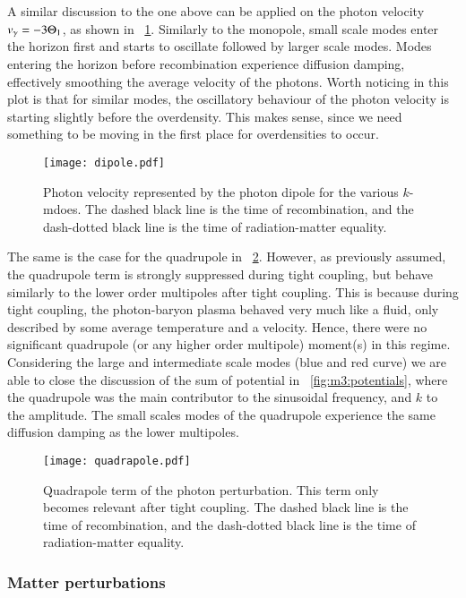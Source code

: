     A similar discussion to the one above can be applied on the photon velocity $v_\gamma = -3\Theta_1$, as shown in ~\cref{fig:m3:dipole}. Similarly to the monopole, small scale modes enter the horizon first and starts to oscillate followed by larger scale modes. Modes entering the horizon before recombination experience diffusion damping, effectively smoothing the average velocity of the photons. Worth noticing in this plot is that for similar modes, the oscillatory behaviour of the photon velocity is starting slightly before the overdensity. This makes sense, since we need something to be moving in the first place for overdensities to occur. 

    \begin{figure}
        \texttt{[image: dipole.pdf]}
        \caption{Photon velocity represented by the photon dipole for the various $k$-mdoes. The dashed black line is the time of recombination, and the dash-dotted black line is the time of radiation-matter equality.}
        \label{fig:m3:dipole}
    \end{figure}

    The same is the case for the quadrupole in ~\cref{fig:m3:quadrapole}. However, as previously assumed, the quadrupole term is strongly suppressed during tight coupling, but behave similarly to the lower order multipoles after tight coupling. This is because during tight coupling, the photon-baryon plasma behaved very much like a fluid, only described by some average temperature and a velocity. Hence, there were no significant quadrupole (or any higher order multipole) moment(s) in this regime. Considering the large and intermediate scale modes (blue and red curve) we are able to close the discussion of the sum of potential in ~\cref{fig:m3:potentials}, where the quadrupole was the main contributor to the sinusoidal frequency, and $k$ to the amplitude. The small scales modes of the quadrupole experience the same diffusion damping as the lower multipoles. 

    \begin{figure}
        \texttt{[image: quadrapole.pdf]}
        \caption{Quadrapole term of the photon perturbation. This term only becomes relevant after tight coupling. The dashed black line is the time of recombination, and the dash-dotted black line is the time of radiation-matter equality.}
        \label{fig:m3:quadrapole}
    \end{figure}

\subsubsection{Matter perturbations}

